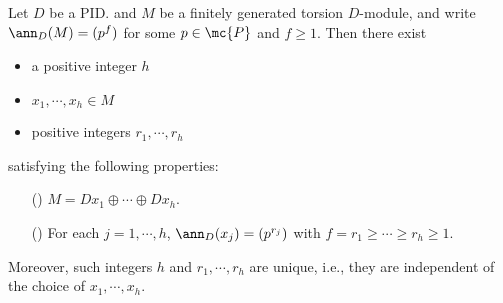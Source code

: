 \begin{thm}\label{CDT 1}
    Let $D$ be a PID. and $M$ be a finitely generated torsion $D$-module, and write $\ann_D(M)=(p^f)$ for some $p\in\mc{P}$ and $f\geq 1$.
    Then there exist
    \begin{itemize}
        \item
        {
            a positive integer $h$
        }
        \item
        {
            $x_1, \cdots, x_h\in M$
        }
        \item
        {
            positive integers $r_1, \cdots, r_h$
        }
    \end{itemize}
    satisfying the following properties:
    \begin{enumerate}
        \item[(\romannumeral 1)]
        {
            $M=Dx_1\oplus\cdots\oplus Dx_h$.
        }
        \item[(\romannumeral 2)]
        {
            For each $j=1, \cdots, h$, $\ann_D(x_j)=(p^{r_j})$ with $f=r_1\geq\cdots\geq r_h\geq 1$.
        }
    \end{enumerate}
    Moreover, such integers $h$ and $r_1, \cdots, r_h$ are unique, i.e., they are independent of the choice of $x_1, \cdots, x_h$.
\end{thm}
